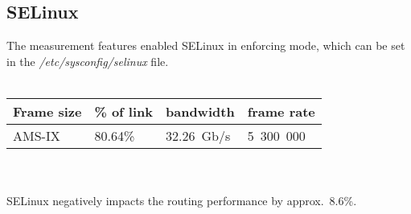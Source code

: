 
\subsection{SELinux}
The measurement features enabled SELinux in enforcing mode, which can be set in the {\it{/etc/sysconfig/selinux}} file.
\\
\\
\begin{tabular}{ | l | l | l | l | }
\hline
Frame size & \% of link & bandwidth & frame rate \\
\hline
AMS-IX & 80.64\% & 32.26~Gb/s & 5~300~000 \\
\hline
\end{tabular}
\\
\\
SELinux negatively impacts the routing performance by approx.~8.6\%.
